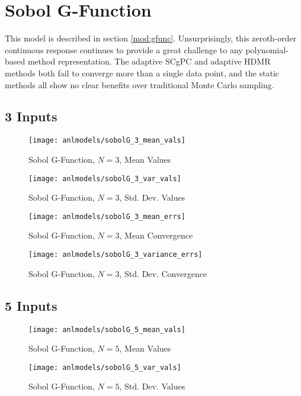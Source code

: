 \section{Sobol G-Function}
This model is described in section \ref{mod:gfunc}.
Unsurprisingly, this zeroth-order continuous response continues to provide a great challenge to any
polynomial-based method representation.  The adaptive SCgPC and adaptive HDMR methods both fail to converge
more than a single data point, and the static methods all show no clear benefits over traditional Monte Carlo
sampling.
\subsection{3 Inputs}
\begin{figure}[H]
  \centering
  \texttt{[image: anlmodels/sobolG\_3\_mean\_vals]}
  \caption{Sobol G-Function, $N=3$, Mean Values}
  \label{fig:hdmr sobolG mean values 3}
\end{figure}
\begin{figure}[H]
  \centering
  \texttt{[image: anlmodels/sobolG\_3\_var\_vals]}
  \caption{Sobol G-Function, $N=3$, Std. Dev. Values}
  \label{fig:hdmr sobolG var values 3}
\end{figure}

\begin{figure}[H]
  \centering
  \texttt{[image: anlmodels/sobolG\_3\_mean\_errs]}
  \caption{Sobol G-Function, $N=3$, Mean Convergence}
  \label{fig:hdmr sobolG mean errors 3}
\end{figure}
\begin{figure}[H]
  \centering
  \texttt{[image: anlmodels/sobolG\_3\_variance\_errs]}
  \caption{Sobol G-Function, $N=3$, Std. Dev. Convergence}
  \label{fig:hdmr sobolG var errors 3}
\end{figure}

\subsection{5 Inputs}
\begin{figure}[H]
  \centering
  \texttt{[image: anlmodels/sobolG\_5\_mean\_vals]}
  \caption{Sobol G-Function, $N=5$, Mean Values}
  \label{fig:hdmr sobolG mean values 5}
\end{figure}
\begin{figure}[H]
  \centering
  \texttt{[image: anlmodels/sobolG\_5\_var\_vals]}
  \caption{Sobol G-Function, $N=5$, Std. Dev. Values}
  \label{fig:hdmr sobolG var values 5}
\end{figure}

